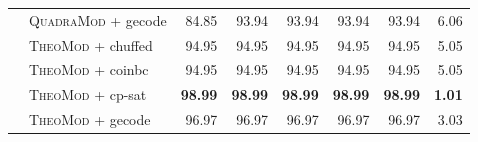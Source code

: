 \documentclass{book}
\begin{document}
\begin{table}[]
\begin{tabular}{@{}ll rr rr rr@{}}
& \textsc{QuadraMod} + gecode   & 84.85 & 93.94 & 93.94 & 93.94 & 93.94 & 6.06 \\
& \textsc{TheoMod} + chuffed   & 94.95 & 94.95 & 94.95 & 94.95 & 94.95 & 5.05 \\
& \textsc{TheoMod} + coinbc   & 94.95 & 94.95 & 94.95 & 94.95 & 94.95 & 5.05 \\
& \textsc{TheoMod} + cp-sat   & \bf 98.99 & \bf 98.99 & \bf 98.99 & \bf 98.99 & \bf 98.99 &  \bf 1.01 \\
& \textsc{TheoMod} + gecode   & 96.97 & 96.97 & 96.97 & 96.97 & 96.97 & 3.03 \\
\bottomrule\end{tabular} 

\end{table} 



\newpage
\end{document}
